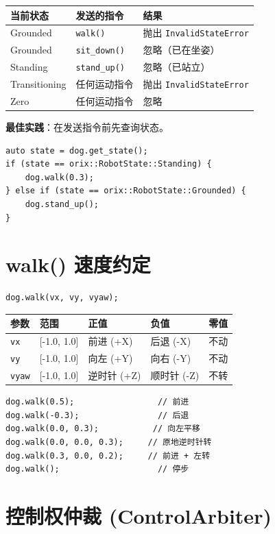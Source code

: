 \documentclass[a4paper,11pt,openany]{book}
\begin{document}
\begin{longtable}{lll}
\toprule
当前状态 & 发送的指令 & 结果 \\
\midrule
\endhead
Grounded & \texttt{walk()} & 抛出 \texttt{InvalidStateError} \\
Grounded & \texttt{sit\_down()} & 忽略（已在坐姿） \\
Standing & \texttt{stand\_up()} & 忽略（已站立） \\
Transitioning & 任何运动指令 & 抛出 \texttt{InvalidStateError} \\
Zero & 任何运动指令 & 忽略 \\
\bottomrule
\end{longtable}

\noindent\textbf{最佳实践}：在发送指令前先查询状态。

\begin{lstlisting}[style=cpp]
auto state = dog.get_state();
if (state == orix::RobotState::Standing) {
    dog.walk(0.3);
} else if (state == orix::RobotState::Grounded) {
    dog.stand_up();
}
\end{lstlisting}

\section{walk() 速度约定}

\begin{lstlisting}[style=cpp]
dog.walk(vx, vy, vyaw);
\end{lstlisting}

\begin{longtable}{lllll}
\toprule
参数 & 范围 & 正值 & 负值 & 零值 \\
\midrule
\endhead
\texttt{vx} & {[}-1.0, 1.0{]} & 前进 (+X) & 后退 (-X) & 不动 \\
\texttt{vy} & {[}-1.0, 1.0{]} & 向左 (+Y) & 向右 (-Y) & 不动 \\
\texttt{vyaw} & {[}-1.0, 1.0{]} & 逆时针 (+Z) & 顺时针 (-Z) & 不转 \\
\bottomrule
\end{longtable}

\begin{lstlisting}[style=cpp]
dog.walk(0.5);                 // 前进
dog.walk(-0.3);                // 后退
dog.walk(0.0, 0.3);           // 向左平移
dog.walk(0.0, 0.0, 0.3);     // 原地逆时针转
dog.walk(0.3, 0.0, 0.2);     // 前进 + 左转
dog.walk();                    // 停步
\end{lstlisting}

\section{控制权仲裁 (ControlArbiter)}
\end{document}

